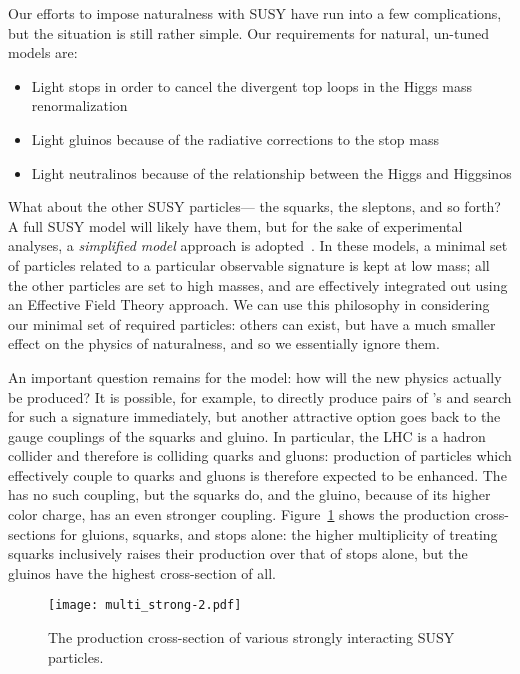 Our efforts to impose naturalness with SUSY have run into a few complications, but the situation is still rather simple. Our requirements for natural, un-tuned models are:
%
\begin{itemize}
\item Light stops in order to cancel the divergent top loops in the Higgs mass renormalization
\item Light gluinos because of the radiative corrections to the stop mass
\item Light neutralinos because of the relationship between the Higgs and Higgsinos
\end{itemize}
%
What about the other SUSY particles--- the squarks, the sleptons, and so forth? A full SUSY model will likely have them, but for the sake of experimental analyses, a \textit{simplified model} approach is adopted~\cite{simplified}. In these models, a minimal set of particles related to a particular observable signature is kept at low mass; all the other particles are set to high masses, and are effectively integrated out using an Effective Field Theory approach. We can use this philosophy in considering our minimal set of required particles: others can exist, but have a much smaller effect on the physics of naturalness, and so we essentially ignore them.


An important question remains for the model: how will the new physics actually be produced? It is possible, for example, to directly produce pairs of \lsp's and search for such a signature immediately, but another attractive option goes back to the gauge couplings of the squarks and gluino. In particular, the LHC is a hadron collider and therefore is colliding quarks and gluons: production of particles which effectively couple to quarks and gluons is therefore expected to be enhanced. The \lsp has no such coupling, but the squarks do, and the gluino, because of its higher color charge, has an even stronger coupling. Figure~\ref{fig:susy:multi_strong} shows the production cross-sections for gluions, squarks, and stops alone: the higher multiplicity of treating squarks inclusively raises their production over that of stops alone, but the gluinos have the highest cross-section of all. 


\begin{figure}
\centering
\texttt{[image: multi\_strong-2.pdf]}
\label{fig:susy:multi_strong}
\caption{The production cross-section of various strongly interacting SUSY particles.}
\end{figure}

